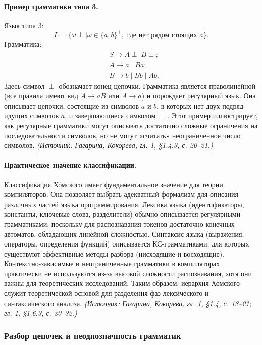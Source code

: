 \documentclass[a4paper,12pt]{article}
\begin{document}
\paragraph{Пример грамматики типа 3.}
Язык типа 3:
\[
L=\{\omega\perp\mid \omega\in\{a,b\}^+,\text{ где нет рядом стоящих }a\}.
\]
Грамматика:
\[
\begin{aligned}
& S\to A\perp\mid B\perp;\\
& A\to a\mid Ba;\\
& B\to b\mid Bb\mid Ab.
\end{aligned}
\]
Здесь символ \(\perp\) обозначает конец цепочки. Грамматика является праволинейной (все правила имеют вид \(A\to aB\) или \(A\to a\)) и порождает регулярный язык. Она описывает цепочки, состоящие из символов \(a\) и \(b\), в которых нет двух подряд идущих символов \(a\), и завершающиеся символом \(\perp\). Этот пример иллюстрирует, как регулярные грамматики могут описывать достаточно сложные ограничения на последовательности символов, но не могут «считать» неограниченное число символов.
\textit{(Источник: Гагарина, Кокорева, гл. 1, §1.4.3, с. 20--21.)}

\paragraph{Практическое значение классификации.}
Классификация Хомского имеет фундаментальное значение для теории компиляторов. Она позволяет выбрать адекватный формализм для описания различных частей языка программирования. Лексика языка (идентификаторы, константы, ключевые слова, разделители) обычно описывается регулярными грамматиками, поскольку для распознавания токенов достаточно конечных автоматов, обладающих линейной сложностью. Синтаксис языка (выражения, операторы, определения функций) описывается КС-грамматиками, для которых существуют эффективные методы разбора (нисходящие и восходящие). Контекстно-зависимые и неограниченные грамматики в компиляторах практически не используются из-за высокой сложности распознавания, хотя они важны для теоретических исследований. Таким образом, иерархия Хомского служит теоретической основой для разделения фаз лексического и синтаксического анализа.
\textit{(Источник: Гагарина, Кокорева, гл. 1, §1.4, с. 18--21; гл. 1, §1.6.3, с. 30--32.)}

\subsubsection{Разбор цепочек и неоднозначность грамматик}
\end{document}
